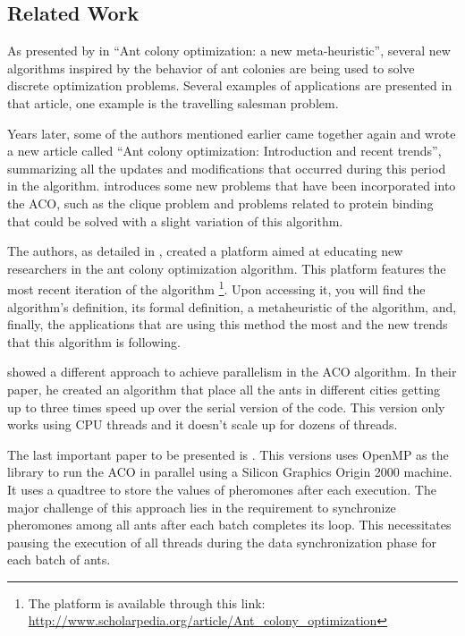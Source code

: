 \subsection{Related Work}


As presented by \cite{ACONewAlgorithm} in ``Ant colony optimization: a new meta-heuristic'', several
new algorithms inspired by the behavior of ant colonies are being used
to solve discrete optimization problems. Several
examples of applications are presented in that article, one example is
the travelling salesman problem.

Years later, some of the authors mentioned earlier came together again and
wrote a new article called ``Ant colony optimization: Introduction and recent trends'', summarizing all the updates
and modifications that occurred during this period in the algorithm. \cite{UpdatesInACO} introduces
some new problems that have been incorporated into the ACO, such as the clique problem and problems
related to protein binding that could be solved with a slight variation of this algorithm.

The authors, as detailed in \cite{ACONewAlgorithm20anos},
created a platform aimed at educating new researchers in the ant colony optimization algorithm.
This platform features the most recent iteration of the algorithm
\footnote{The platform is available through this link: \url{http://www.scholarpedia.org/article/Ant_colony_optimization}}.
Upon accessing it, you will find the algorithm's definition, its formal definition, a metaheuristic
of the algorithm, and, finally, the applications that are using this method the most and the new trends
that this algorithm is following.

\cite{paralellAco} showed a different approach to achieve parallelism in the ACO algorithm.
In their paper, he created an algorithm that place all the ants in different
cities getting up to three times speed up over the serial version of the code. This version only works
using CPU threads and it doesn't scale up for dozens of threads.

The last important paper to be presented is \cite{openmpAco}. This versions uses OpenMP as the library
to run the ACO in parallel using a Silicon Graphics Origin 2000 machine.
It uses a quadtree to store the values of pheromones after each execution.
The major challenge of this approach lies in the requirement to synchronize
pheromones among all ants after each batch completes its loop. This necessitates pausing the
execution of all threads during the data synchronization phase for each batch of ants.
